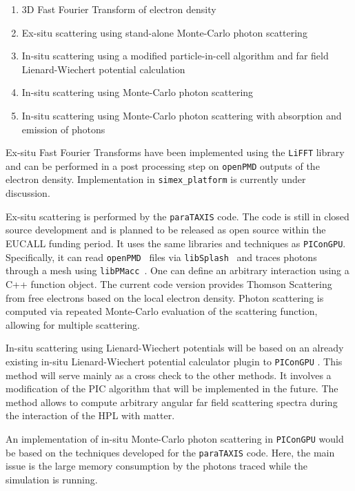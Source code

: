 \documentclass[12pt]{scrartcl}
\begin{document}
\begin{enumerate}
  \item 3D Fast Fourier Transform of electron density
    \label{pmi:methods:fft}
  \item Ex-situ scattering using stand-alone
    Monte-Carlo photon scattering \label{pmi:methods:exsituphoton}
  \item In-situ scattering using a modified particle-in-cell algorithm and far field
      Lienard-Wiechert potential calculation \label{pmi:methods:insitulienardwiechert}
    \item In-situ scattering using Monte-Carlo photon
    scattering\label{pmi:methods:insituphoton}
  \item In-situ scattering using Monte-Carlo photon scattering with absorption
    and emission of photons\label{pmi:methods:insituphotoninteract}
\end{enumerate}

Ex-situ Fast Fourier Transforms have been implemented using the \texttt{LiFFT}
library \cite{liblifft_github} and can be performed in a post processing step on
\texttt{openPMD} outputs of the electron density. Implementation in
\texttt{simex\_platform} is currently under discussion.

Ex-situ scattering is performed by the \texttt{paraTAXIS} code.
The code is still in closed source development and is planned to be released as open
source within the EUCALL funding period.
It uses the same libraries and
techniques as \texttt{PIConGPU}. Specifically, it can read
\texttt{openPMD}~\cite{openPMD} files via
\texttt{libSplash}~\cite{libSplash_github} and traces photons through a mesh
using \texttt{libPMacc}~\cite{picongpu_github}. One can define an arbitrary
interaction using a C++ function object. The current code version provides
Thomson Scattering from free electrons based on the local electron density.
Photon scattering is computed via repeated Monte-Carlo evaluation of the
scattering function, allowing for multiple scattering.

In-situ scattering using Lienard-Wiechert potentials will be based on an already
existing in-situ Lienard-Wiechert potential calculator plugin to
\texttt{PIConGPU} \cite{Pausch2013}. This method will serve mainly as a cross
check to the other methods. It involves a modification of the PIC algorithm that
will be implemented in the future. The method allows to compute arbitrary
angular far field scattering spectra during the interaction of the HPL with
matter.

An implementation of in-situ Monte-Carlo photon scattering in \texttt{PIConGPU}
would be based on the techniques developed for the \texttt{paraTAXIS} code. Here, the
main issue is the large memory consumption by the photons traced while the
simulation is running.
\end{document}
